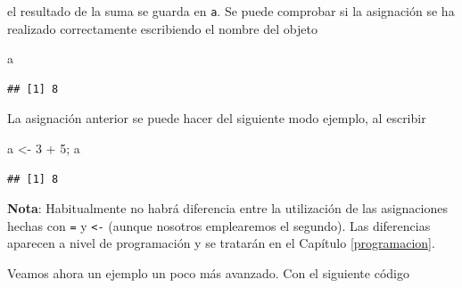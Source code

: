 \documentclass[
]{book}
\newenvironment{Shaded}{\begin{snugshade}}{\end{snugshade}}
\newcommand{\DecValTok}[1]{\textcolor[rgb]{0.00,0.00,0.81}{#1}}
\newcommand{\NormalTok}[1]{#1}
\newcommand{\OtherTok}[1]{\textcolor[rgb]{0.56,0.35,0.01}{#1}}
\newcommand{\SpecialCharTok}[1]{\textcolor[rgb]{0.00,0.00,0.00}{#1}}
\theoremstyle{break}
\begin{document}
el resultado de la suma se guarda en \texttt{a}. Se puede comprobar si la
asignación se ha realizado correctamente escribiendo el nombre del
objeto

\begin{Shaded}
\begin{Highlighting}[]
\NormalTok{a}
\end{Highlighting}
\end{Shaded}

\begin{verbatim}
## [1] 8
\end{verbatim}

La asignación anterior se puede hacer del siguiente modo
ejemplo, al escribir

\begin{Shaded}
\begin{Highlighting}[]
\NormalTok{a }\OtherTok{\textless{}{-}} \DecValTok{3} \SpecialCharTok{+} \DecValTok{5}\NormalTok{; a}
\end{Highlighting}
\end{Shaded}

\begin{verbatim}
## [1] 8
\end{verbatim}

\textbf{Nota}: Habitualmente no habrá diferencia entre la utilización de las
asignaciones hechas con \texttt{=} y \texttt{\textless{}-} (aunque nosotros emplearemos el segundo).
Las diferencias aparecen a nivel
de programación y se tratarán en el Capítulo \ref{programacion}.

Veamos ahora un ejemplo un poco más avanzado. Con el
siguiente código
\end{document}
